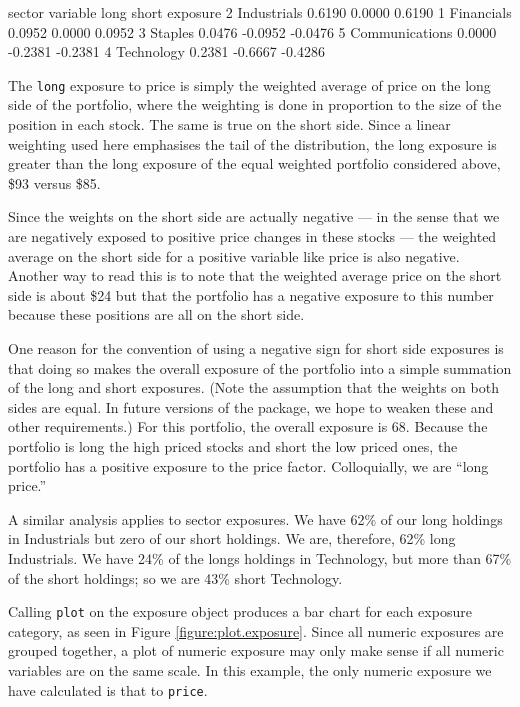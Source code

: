 \documentclass[a4paper]{report}
\begin{document}
\begin{article}
\begin{Schunk}
\begin{Soutput}
sector 
        variable   long   short exposure
2    Industrials 0.6190  0.0000   0.6190
1     Financials 0.0952  0.0000   0.0952
3        Staples 0.0476 -0.0952  -0.0476
5 Communications 0.0000 -0.2381  -0.2381
4     Technology 0.2381 -0.6667  -0.4286
\end{Soutput}
\end{Schunk}

The \texttt{long} exposure to price is simply the weighted average of
price on the long side of the portfolio, where the weighting is done
in proportion to the size of the position in each stock. The same is
true on the short side.  Since a linear weighting used here emphasises
the tail of the distribution, the long exposure is greater than the
long exposure of the equal weighted portfolio considered above, \$93
versus \$85.

Since the weights on the short side are actually negative --- in the
sense that we are negatively exposed to positive price changes in
these stocks --- the weighted average on the short side for a positive
variable like price is also negative.  Another way to read this is to
note that the weighted average price on the short side is about \$24
but that the portfolio has a negative exposure to this number because
these positions are all on the short side.

One reason for the convention of using a negative sign for short side
exposures is that doing so makes the overall exposure of the portfolio
into a simple summation of the long and short exposures. (Note the
assumption that the weights on both sides are equal. In future
versions of the  package, we hope to weaken these and
other requirements.) For this portfolio, the overall exposure is 68.
Because the portfolio is long the high priced stocks and short the low
priced ones, the portfolio has a positive exposure to the price
factor. Colloquially, we are ``long price.''

A similar analysis applies to sector exposures. We have 62\% of our
long holdings in Industrials but zero of our short holdings. We are,
therefore, 62\% long Industrials. We have 24\% of the longs holdings
in Technology, but more than 67\% of the short holdings; so we are
43\% short Technology.

Calling \texttt{plot} on the exposure object produces a bar chart for
each exposure category, as seen in Figure \ref{figure:plot.exposure}.  Since all
numeric exposures are grouped together, a plot of numeric exposure may
only make sense if all numeric variables are on the same scale.  In
this example, the only numeric exposure we have calculated is that to
\texttt{price}.


\end{article}
\end{document}
